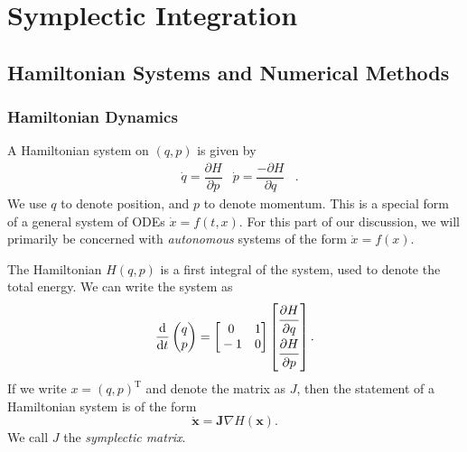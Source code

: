 

\chapter{Symplectic Integration}

\section{Hamiltonian Systems and Numerical Methods}

\subsection{Hamiltonian Dynamics}

A Hamiltonian system on $(q,p)$ is given by
\begin{align*}
	&\dot{q} = \dfrac{\partial H}{\partial p}
	&
	\dot{p} = \dfrac{-\partial H}{\partial q}&.	
\end{align*}
We use $q$ to denote position, and $p$ to denote momentum.
This is a special form of a general system of ODEs $\dot{x} = f(t,x)$.
For this part of our discussion, we will primarily be concerned with \textit{autonomous} systems of the form $\dot{x} = f(x)$.

The Hamiltonian $H(q,p)$ is a first integral of the system, used to denote the total energy.
We can write the system as
\begin{equation}
	\dfrac{\mathrm{d}}{\mathrm{d}t}\begin{pmatrix}
		q \\
		p
	\end{pmatrix} = \begin{bmatrix}
		\strut 0 & \strut 1 \\
		\strut -1 & \strut 0
	\end{bmatrix}\begin{bmatrix}
	\dfrac{\strut \partial H}{\strut\partial q} \\
	\dfrac{\strut \partial H}{\strut\partial p}
	\end{bmatrix}.
\end{equation}
If we write $x = (q,p)^\mathrm{T}$ and denote the matrix as $J$,
then the statement of a Hamiltonian system is of the form 
\begin{equation}
	\mathbf{\dot{x}} = \mathbf{J}\nabla H(\mathbf{x}).
	\label{eqn:hdyn}
\end{equation}
We call $J$ the \textit{symplectic matrix}.

